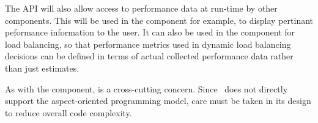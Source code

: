 \documentclass[10pt,twocolumn]{article}
\begin{document}
The API will also allow access to performance data at run-time by
other components.  This will be used in the  component
for example, to display pertinant peformance information to the user.
It can also be used in the  component for load
balancing, so that performance metrics used in dynamic load balancing
decisions can be defined in terms of actual collected performance data
rather than just estimates.

As with the  component,  is a
cross-cutting concern.  Since \cpp\ does not directly support the
aspect-oriented programming model, care must be taken in its design to
reduce overall code complexity.

% 
% 
% 
% 



\end{document}
